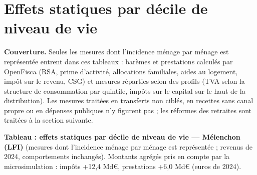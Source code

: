 \documentclass[
  11pt,
  11pt,
  a4paper,
  openany]{book}
\begin{document}
\hypertarget{sec:deciles}{%
\section{Effets statiques par décile de niveau de
vie}\label{sec:deciles}}

\textbf{Couverture.} Seules les mesures dont l'incidence ménage par
ménage est représentée entrent dans ces tableaux : barèmes et
prestations calculés par OpenFisca (RSA, prime d'activité, allocations
familiales, aides au logement, impôt sur le revenu, CSG) et mesures
réparties selon des profils (TVA selon la structure de consommation par
quintile, impôts sur le capital sur le haut de la distribution). Les
mesures traitées en transferts non ciblés, en recettes sans canal propre
ou en dépenses publiques n'y figurent pas ; les réformes des retraites
sont traitées à la section suivante.

\textbf{Tableau : effets statiques par décile de niveau de vie ---
Mélenchon (LFI)} (mesures dont l'incidence ménage par ménage est
représentée ; revenus de 2024, comportements inchangés). Montants
agrégés pris en compte par la microsimulation : impôts +12,4 Md€,
prestations +6,0 Md€ (euros de 2024).
\end{document}
